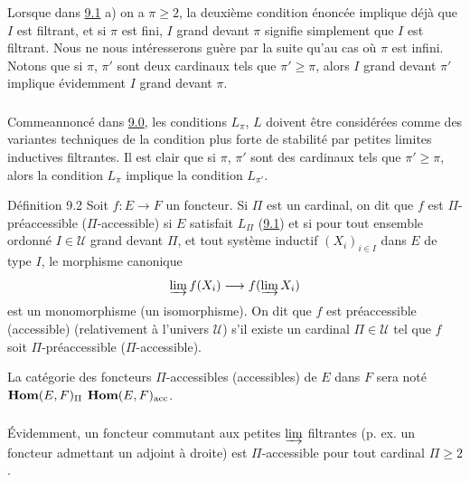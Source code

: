 \documentclass[10pt]{../fichiers-configuration-latex/smfart}
\begin{document}
\setcounter{subsection}{1}
\subsubsection{}
Lorsque dans \hyperref[I.def9.1]{9.1} a) on a $\pi \geq 2$, la deuxième condition
énoncée
implique déjà que $I$ est filtrant, et si $\pi$ est fini, $I$ grand
devant $\pi$ signifie simplement que $I$ est filtrant. Nous ne nous
intéresserons guère par la suite qu'au cas où $\pi$ est infini.
Notons que si $\pi$, $\pi'$ sont deux cardinaux tels que $\pi'\geq
\pi$, alors $I$ grand devant $\pi'$ implique évidemment $I$ grand
devant $\pi$.

\subsubsection{}
Comme\pageoriginale annoncé dans \hyperref[I.sec9.0]{9.0}, les conditions
$L_{\pi}$, $L$
doivent être considérées comme des variantes techniques de la
condition plus forte de stabilité par petites limites inductives
filtrantes. Il est clair que si $\pi$, $\pi'$ sont des cardinaux
tels que $\pi'\geq \pi$, alors la condition $L_{\pi}$ implique la
condition $L_{\pi'}$.

\begin{enonce*}{Définition 9.2}
Soit $f:E\rightarrow F$ un foncteur. Si $\Pi$ est un cardinal, on
dit que $f$ est $\Pi$-préaccessible (\resp $\Pi$-accessible) si $E$
satisfait $L_{\Pi}$ (\hyperref[I.def9.1]{9.1}) et si pour tout ensemble ordonné $I\in
𝒰$ grand devant $\Pi$, et tout système inductif $(X_i)_{i\in
I}$ dans $E$ de type $I$, le morphisme canonique
$$
\varinjlim f(X_i)\longrightarrow f(\varinjlim X_i)
$$
est un monomorphisme (\resp un isomorphisme). On dit que $f$ est
préaccessible \\ (\resp accessible) (relativement à l'univers
$𝒰$) s'il existe un cardinal $\Pi\in 𝒰$ tel que $f$
soit $\Pi$-préaccessible (\resp $\Pi$-accessible).
\end{enonce*}

La catégorie des foncteurs $\Pi$-accessibles (\resp accessibles) de
$E$ dans $F$ sera noté $\operatorname{\mathbf{Hom}}(E,F)_{\Pi}$ \resp $\operatorname{\mathbf{Hom}}(E,F)_{\operatorname{acc}}$.

\setcounter{subsection}{2} \setcounter{subsubsection}{0}
\subsubsection{}
Évidemment, un foncteur commutant aux petites $\varinjlim$
filtrantes (p. ex. un foncteur admettant un adjoint à droite) est
$\Pi$-accessible pour tout cardinal $\Pi\geq 2$.
\end{document}
